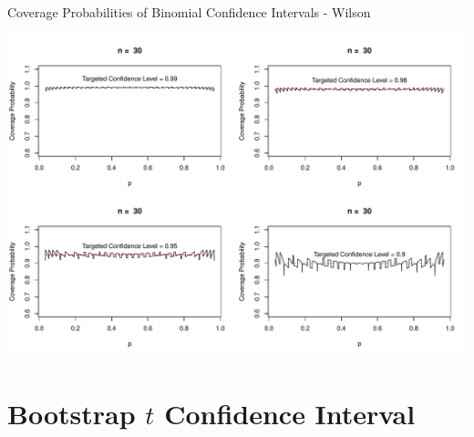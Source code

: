 \documentclass[
  ignorenonframetext,
]{beamer}
\begin{document}
\begin{frame}{Coverage Probabilities of Binomial Confidence Intervals -
Wilson}
\protect\hypertarget{coverage-probabilities-of-binomial-confidence-intervals---wilson-1}{}
\tiny

\begin{center}\includegraphics[width=0.9\linewidth,height=0.8\textheight]{Week11_12_13_files/figure-beamer/unnamed-chunk-21-1} \end{center}
\normalsize
\end{frame}

\hypertarget{bootstrap-t-confidence-interval}{%
\section{\texorpdfstring{Bootstrap \(t\) Confidence
Interval}{Bootstrap t Confidence Interval}}\label{bootstrap-t-confidence-interval}}
\end{document}

